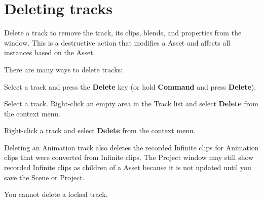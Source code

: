 \chapter{Deleting tracks}
\hypertarget{md__hey_tea_9_2_library_2_package_cache_2com_8unity_8timeline_0d1_87_85_2_documentation_0i_2trk__delete}{}\label{md__hey_tea_9_2_library_2_package_cache_2com_8unity_8timeline_0d1_87_85_2_documentation_0i_2trk__delete}
\label{md__hey_tea_9_2_library_2_package_cache_2com_8unity_8timeline_0d1_87_85_2_documentation_0i_2trk__delete_autotoc_md4757}%
%
 Delete a track to remove the track, its clips, blends, and properties from the  window. This is a destructive action that modifies a  Asset and affects all  instances based on the  Asset.

There are many ways to delete tracks\+:


\begin{DoxyItemize}
\item Select a track and press the {\bfseries{Delete}} key (or hold {\bfseries{Command}} and press {\bfseries{Delete}}).
\item Select a track. Right-\/click an empty area in the Track list and select {\bfseries{Delete}} from the context menu.
\item Right-\/click a track and select {\bfseries{Delete}} from the context menu.
\end{DoxyItemize}

Deleting an Animation track also deletes the recorded Infinite clips for Animation clips that were converted from Infinite clips. The Project window may still show recorded Infinite clips as children of a  Asset because it is not updated until you save the Scene or Project.

You cannot delete a locked track. 